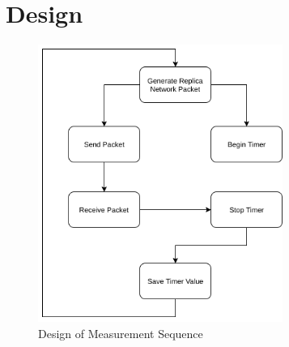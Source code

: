 \chapter{Design}\label{C:design}

\begin{figure}[H]
    \begin{center}
        \includegraphics[keepaspectratio,width=8cm]{Images/MeasurementSequence}
        \caption{Design of Measurement Sequence}
        \label{fig:measurementsequence}
    \end{center}
\end{figure}

